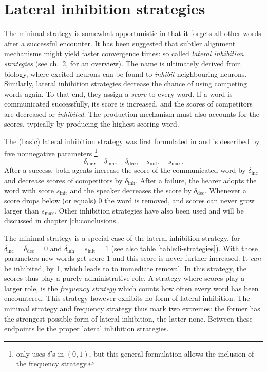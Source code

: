 \documentclass{../src/bcthesispart}
\begin{document}
\section{Lateral inhibition strategies}

The minimal strategy is somewhat opportunistic in that it forgets all other words after a successful encounter.
It has been suggested that subtler alignment mechanisms might yield faster convergence times: so called \emph{lateral inhibition strategies} (see \cite{Wellens2012} ch.~2, for an overview).
The name is ultimately derived from biology, where excited neurons can be found to \emph{inhibit} neighbouring neurons.
Similarly, lateral inhibition strategies decrease the chance of using competing words again.
To that end, they assign a \emph{score} to every word.
If a word is communicated successfully, its score is increased, and the scores of competitors are decreased or \emph{inhibited}.
The production mechanism must also accounts for the scores, typically by producing the highest-scoring word.




The (basic) lateral inhibition strategy was first formulated in \textcite{Steels2005} and is described by five nonnegative parameters \parencite{Wellens2012}\footnote{%
	\textcite{Wellens2012} only uses $\delta$’s in $(0,1)$, but this general formulation allows the inclusion of the frequency strategy.
	}
\begin{equation}
	\delta_{\text{inc}}, \quad
	\delta_{\text{inh}}, \quad
	\delta_{\text{dec}}, \quad
	s_{\text{init}}, \quad 
	s_{\text{max}}.	
\end{equation}
After a success, both agents increase the score of the communicated word by $\delta_{\text{inc}}$ and decrease scores of competitors by $\delta_{\text{inh}}$. 
After a failure, the hearer adopts the word with score $s_{\text{init}}$ and the speaker decreases the score by $\delta_{\text{dec}}$.
Whenever a score drops below (or equals) 0 the word is removed, and scores can never grow larger than $s_{\text{max}}$.
Other inhibition strategies have also been used and will be discussed in chapter \ref{ch:conclusions}.




The minimal strategy is a special case of the lateral inhibition strategy, for $\delta_{\text{inc}} = \delta_{\text{dec}} = 0$ and $\delta_{\text{inh}} = s_{\text{init}} = 1$ (see also table \ref{table:li-strategies}).
With those parameters new words get score 1 and this score is never further increased. 
It \emph{can} be inhibited, by 1, which leads to to immediate removal.
In this strategy, the scores thus play a purely administrative role.
A strategy where scores play a larger role, is the \emph{frequency strategy} which counts how often every word has been encountered.
This strategy however exhibits no form of lateral inhibition.
The minimal strategy and frequency strategy thus mark two extremes: the former has the strongest possible form of lateral inhibition, the latter none.
Between these endpoints lie the proper lateral inhibition strategies.
\end{document}
